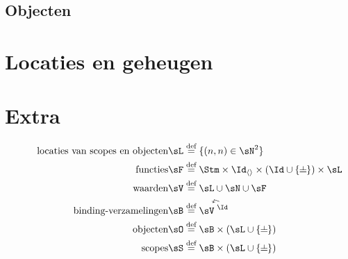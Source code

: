 \subsection{Objecten}

\section{Locaties en geheugen}\label{sec:locaties}

\section*{Extra}

\begin{align*}
  \tag*{locaties van scopes en objecten}
  \sL &\DEF \{ (n, n) \in \sN^2 \} \\
  \tag*{functies}
  \sF &\DEF \Stm \times \Id_{\langle\rangle} \times (\Id \cup \{\BOT\}) \times \sL \\
  \tag*{waarden}
  \sV &\DEF \sL \cup \sN \cup \sF \\
  \tag*{binding-verzamelingen}
  \sB &\DEF \FiniteFunctions{\sV}{\Id} \\
  \tag*{objecten}
  \sO &\DEF \sB \times (\sL \cup \{\BOT\}) \\
  \tag*{scopes}
  \sS &\DEF \sB \times (\sL \cup \{\BOT\}) \\
\end{align*}

